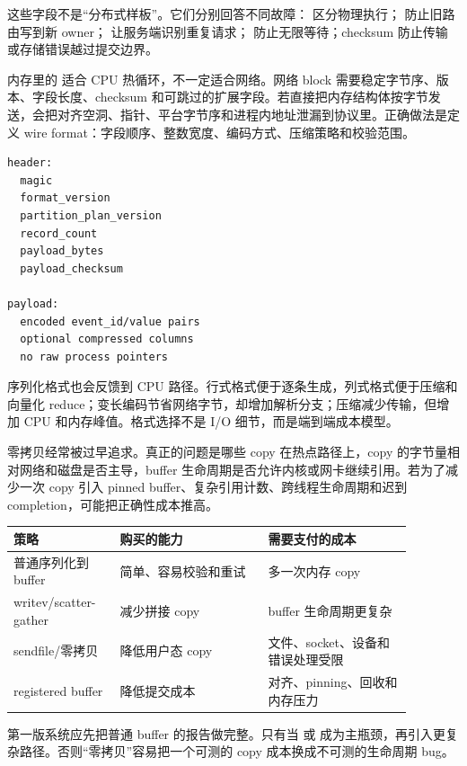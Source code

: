 这些字段不是“分布式样板”。它们分别回答不同故障： 区分物理执行； 防止旧路由写到新 owner； 让服务端识别重复请求； 防止无限等待；checksum 防止传输或存储错误越过提交边界。

内存里的  适合 CPU 热循环，不一定适合网络。网络 block 需要稳定字节序、版本、字段长度、checksum 和可跳过的扩展字段。若直接把内存结构体按字节发送，会把对齐空洞、指针、平台字节序和进程内地址泄漏到协议里。正确做法是定义 wire format：字段顺序、整数宽度、编码方式、压缩策略和校验范围。

\begin{lstlisting}[numbers=none,caption={ShuffleBlock wire format 的账本}]
header:
  magic
  format_version
  partition_plan_version
  record_count
  payload_bytes
  payload_checksum

payload:
  encoded event_id/value pairs
  optional compressed columns
  no raw process pointers
\end{lstlisting}

序列化格式也会反馈到 CPU 路径。行式格式便于逐条生成，列式格式便于压缩和向量化 reduce；变长编码节省网络字节，却增加解析分支；压缩减少传输，但增加 CPU 和内存峰值。格式选择不是 I/O 细节，而是端到端成本模型。

零拷贝经常被过早追求。真正的问题是哪些 copy 在热点路径上，copy 的字节量相对网络和磁盘是否主导，buffer 生命周期是否允许内核或网卡继续引用。若为了减少一次 copy 引入 pinned buffer、复杂引用计数、跨线程生命周期和迟到 completion，可能把正确性成本推高。

\begin{center}
\small
\begin{tabular}{@{}p{0.23\linewidth}p{0.33\linewidth}p{0.32\linewidth}@{}}
\toprule
策略 & 购买的能力 & 需要支付的成本 \\
\midrule
普通序列化到 buffer & 简单、容易校验和重试 & 多一次内存 copy \\
writev/scatter-gather & 减少拼接 copy & buffer 生命周期更复杂 \\
sendfile/零拷贝 & 降低用户态 copy & 文件、socket、设备和错误处理受限 \\
registered buffer & 降低提交成本 & 对齐、pinning、回收和内存压力 \\
\bottomrule
\end{tabular}
\end{center}

第一版系统应先把普通 buffer 的报告做完整。只有当  或  成为主瓶颈，再引入更复杂路径。否则“零拷贝”容易把一个可测的 copy 成本换成不可测的生命周期 bug。

